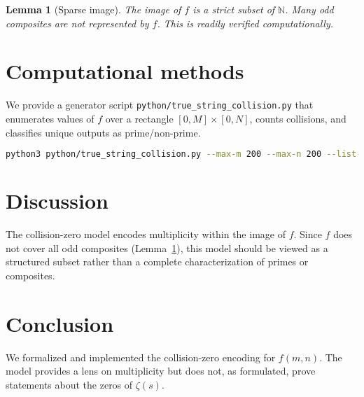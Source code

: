 \documentclass[12pt,a4paper]{article}
\newtheorem{lemma}{Lemma}[section]
\begin{document}
\begin{lemma}[Sparse image]\label{lem:sparse}
The image of \(f\) is a strict subset of \(\mathbb{N}\). Many odd composites are not represented by \(f\). This is readily verified computationally.
\end{lemma}

\section{Computational methods}
We provide a generator script \texttt{python/true\_string\_collision.py} that enumerates values of \(f\) over a rectangle \([0,M]\times[0,N]\), counts collisions, and classifies unique outputs as prime/non-prime.

\begin{lstlisting}[language=bash,caption=Example usage]
python3 python/true_string_collision.py --max-m 200 --max-n 200 --list-first 20
\end{lstlisting}

\section{Discussion}
The collision-zero model encodes multiplicity within the image of \(f\). Since \(f\) does not cover all odd composites (Lemma~\ref{lem:sparse}), this model should be viewed as a structured subset rather than a complete characterization of primes or composites.

\section{Conclusion}
We formalized and implemented the collision-zero encoding for \(f(m,n)\). The model provides a lens on multiplicity but does not, as formulated, prove statements about the zeros of \(\zeta(s)\).
\end{document}
